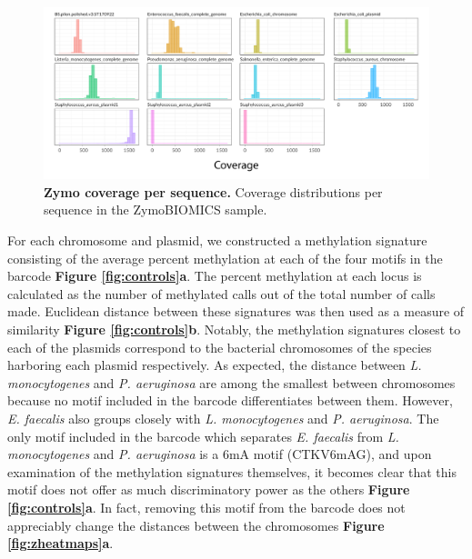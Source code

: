 \begin{figure}[!hb]
\centering
\includegraphics[width = 1\linewidth,keepaspectratio]{figure/covhists.pdf}
\caption[Zymo coverage per sequence]{{\bf Zymo coverage per sequence.} Coverage distributions per sequence in the ZymoBIOMICS sample. }
\label{fig:covhists}
\end{figure}


For each chromosome and plasmid, we constructed a methylation signature consisting of the average percent methylation at each of the four motifs in the barcode {\bf Figure \ref{fig:controls}a}. The percent methylation at each locus is calculated as the number of methylated calls out of the total number of calls made. Euclidean distance between these signatures was then used as a measure of similarity {\bf Figure \ref{fig:controls}b}. Notably, the methylation signatures closest to each of the plasmids correspond to the bacterial chromosomes of the species harboring each plasmid respectively. As expected, the distance between \textit{L. monocytogenes} and \textit{P. aeruginosa} are among the smallest between chromosomes because no motif included in the barcode differentiates between them. However, \textit{E. faecalis} also groups closely with \textit{L. monocytogenes} and \textit{P. aeruginosa}. The only motif included in the barcode which separates \textit{E. faecalis} from \textit{L. monocytogenes} and \textit{P. aeruginosa} is a 6mA motif (CTKV6mAG), and upon examination of the methylation signatures themselves, it becomes clear that this motif does not offer as much discriminatory power as the others {\bf Figure \ref{fig:controls}a}. In fact, removing this motif from the barcode does not appreciably change the distances between the chromosomes {\bf Figure \ref{fig:zheatmaps}a}.

